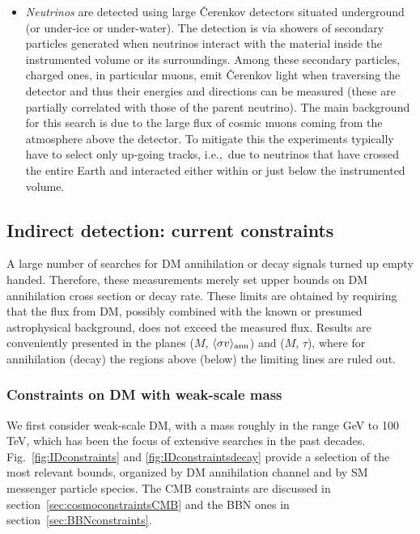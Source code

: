 \begin{itemize}
\item[$\circ$] {\em Neutrinos} are detected using large \v Cerenkov detectors situated underground (or under-ice or under-water). The detection is via showers of secondary particles generated when neutrinos interact with the material inside the instrumented volume or its surroundings. 
Among these secondary particles, charged ones, in particular muons, emit \v Cerenkov light when traversing the detector and thus their energies and directions can be measured
(these are partially correlated with those of the parent neutrino). The main background for this search is due to the large flux of cosmic muons coming from the atmosphere above the detector. To mitigate this the experiments typically have to select only up-going tracks, i.e.,\ due to neutrinos that have crossed the entire Earth and interacted either within or just below the instrumented volume.
\end{itemize}




\subsection{Indirect detection: current constraints}
\label{sec:IDconstraints}
A large number of searches for DM annihilation or decay signals turned up empty handed. 
Therefore, these measurements merely set upper bounds on DM annihilation cross section or decay rate.
These limits are obtained by requiring that the flux from DM, possibly combined with the known or presumed astrophysical background, does not exceed the measured flux. 
Results are conveniently presented in the planes ($M$, $\langle \sigma v \rangle_{\rm ann}$) and  ($M$, $\tau$), where for annihilation (decay) the regions above (below) the limiting lines are ruled out.


\subsubsection{Constraints on DM with weak-scale mass}\label{sec:IDconstraintsWIMPs}
We first consider weak-scale DM, with a mass roughly in the range GeV to 100 TeV, which has been the focus of extensive searches in the past decades. 
Fig.~\ref{fig:IDconstraints} and \ref{fig:IDconstraintsdecay} provide a selection of the most relevant bounds, 
organized by DM annihilation channel and by SM messenger particle species. The CMB constraints are discussed in section~\ref{sec:cosmoconstraintsCMB} and the BBN ones in section~\ref{sec:BBNconstraints}.


